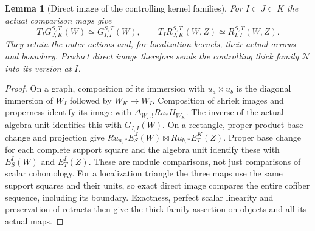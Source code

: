 \documentclass[11pt]{article}
\newtheorem{lemma}[proposition]{Lemma}
\theoremstyle{definition}
\theoremstyle{remark}
\begin{document}
\begin{lemma}[Direct image of the controlling kernel families]
\label{lem:product-generators}
For $I\subset J\subset K$ the actual comparison maps give
\[
 T_I G_{J,K}^{S,T}(W)\simeq G_{I,I}^{S,T}(W),\qquad
 T_I R_{J,K}^{S,T}(W,Z)\simeq R_{I,I}^{S,T}(W,Z).
\]
They retain the outer actions and, for localization kernels, their
actual arrows and boundary.  Product direct image therefore sends
the controlling thick family $\mathcal N$ into its version at $I$.
\end{lemma}
\begin{proof}
On a graph, composition of its immersion with $u_a\times u_b$
is the diagonal immersion of $W_I$ followed by $W_K\to W_I$.
Composition of shriek images and properness identify its image with
$\Delta_{W_I,!}Ru_*H_{W_K}$.  The inverse of the actual algebra unit
identifies this with $G_{I,I}(W)$.
On a rectangle, proper product base change and projection give
$Ru_{a,*}E_S^J(W)\boxtimes Ru_{b,*}E_T^K(Z)$.
Proper base change for each complete support square and the algebra
unit identify these with $E_S^I(W)$ and $E_T^I(Z)$.
These are module comparisons, not just comparisons of scalar cohomology.
For a localization triangle the three maps use the same support
squares and their units, so exact direct image compares the entire
cofiber sequence, including its boundary.  Exactness, perfect scalar
linearity and preservation of retracts then give the thick-family
assertion on objects and all its actual maps.
\end{proof}
\end{document}
